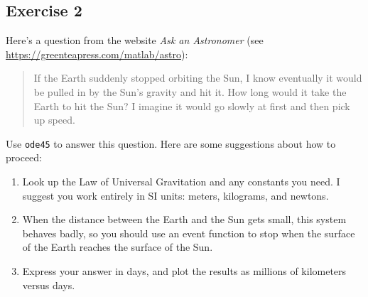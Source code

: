 



\subsection{Exercise 2}
\label{earth}


Here's a question from the website \emph{Ask an Astronomer} (see \url{https://greenteapress.com/matlab/astro}):

\begin{quote}
If the Earth suddenly stopped orbiting the Sun, I know eventually it would be pulled in by the Sun's gravity and hit it. How long would it take the Earth to hit the Sun? I imagine it would go slowly at first and then pick up speed.
\end{quote}

Use \lstinline{ode45} to answer this question.  Here are some suggestions about how to proceed:

\begin{enumerate}

\item Look up the Law of Universal Gravitation and any constants you need. I suggest you work entirely in SI units: meters, kilograms, and newtons.

\item When the distance between the Earth and the Sun gets small, this system behaves badly, so you should use an event function to stop when the surface of the Earth reaches the surface of the Sun.

\item Express your answer in days, and plot the results as millions of kilometers versus days.

\end{enumerate}





